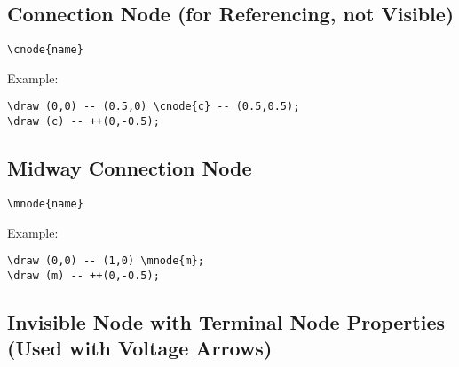 \documentclass[parskip=full]{scrartcl}
\begin{document}
\subsection{Connection Node (for Referencing, not Visible)}

\begin{verbatim}
\cnode{name}
\end{verbatim}

Example:\\
\begin{minipage}{0.8\textwidth}
\begin{verbatim}
\draw (0,0) -- (0.5,0) \cnode{c} -- (0.5,0.5);
\draw (c) -- ++(0,-0.5);
\end{verbatim}
\end{minipage}
\begin{minipage}{0.19\textwidth}
\end{minipage}

\subsection{Midway Connection Node}

\begin{verbatim}
\mnode{name}
\end{verbatim}

Example:\\
\begin{minipage}{0.8\textwidth}
\begin{verbatim}
\draw (0,0) -- (1,0) \mnode{m};
\draw (m) -- ++(0,-0.5);
\end{verbatim}
\end{minipage}
\begin{minipage}{0.19\textwidth}
\end{minipage}

\subsection{Invisible Node with Terminal Node Properties (Used with Voltage Arrows)}
\end{document}
